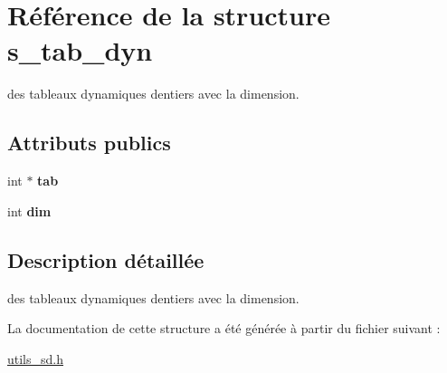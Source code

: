 \hypertarget{structs__tab__dyn}{}\section{Référence de la structure s\+\_\+tab\+\_\+dyn}
\label{structs__tab__dyn}


des tableaux dynamiques d\textquotesingle{}entiers avec la dimension.  


\subsection*{Attributs publics}
\begin{DoxyCompactItemize}
\item 
\mbox{\label{structs__tab__dyn_a2063f1b11458b095684438e790ad6127}} 
int $\ast$ {\bfseries tab}
\item 
\mbox{\label{structs__tab__dyn_aec37643e88098f3c1466cc3e64ef303b}} 
int {\bfseries dim}
\end{DoxyCompactItemize}


\subsection{Description détaillée}
des tableaux dynamiques d\textquotesingle{}entiers avec la dimension. 

La documentation de cette structure a été générée à partir du fichier suivant \+:\begin{DoxyCompactItemize}
\item 
\hyperlink{utils__sd_8h}{utils\+\_\+sd.\+h}\end{DoxyCompactItemize}
